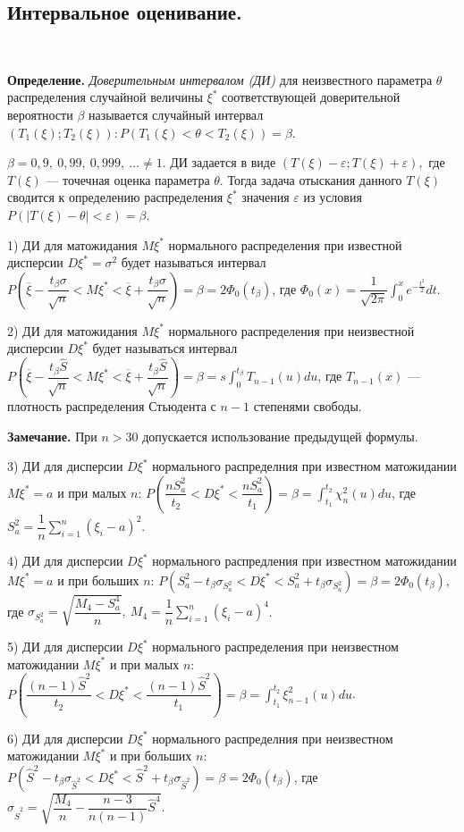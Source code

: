 \documentclass[9pt]{article}
\begin{document}
\subsection{Интервальное оценивание.}

\ 
\par\textbf{Определение.} \textit{Доверительным интервалом (ДИ)} для неизвестного параметра \(\theta\) распределения случайной величины \(\xi^*\) соответствующей доверительной вероятности \(\beta\) называется случайный интервал \((T_1(\xi);T_2(\xi)):P(T_1(\xi)<\theta<T_2(\xi))=\beta\).
\par\(\beta=0,9,\ 0,99,\ 0,999,\ ... \neq 1\).
 ДИ задается в виде \((T(\xi)-\varepsilon;T(\xi)+\varepsilon),\) где \(T(\xi)\) --- точечная оценка параметра \(\theta\). Тогда задача отыскания данного \(T(\xi)\) сводится к определению распределения \(\xi^*\) значения \(\varepsilon\) из условия \(P(|T(\xi)-\theta|<\varepsilon)=\beta\).
\par1) ДИ для матожидания \(M\xi^*\) нормального распределения при известной дисперсии \(D\xi^*=\sigma^2\) будет называться интервал \(P(\overline\xi-\dfrac{t_\beta\sigma}{\sqrt{n}}<M\xi^*<\overline\xi+\dfrac{t_\beta\sigma}{\sqrt{n}})=\beta=2\Phi_0(t_\beta)\), где \(\Phi_0(x)=\dfrac{1}{\sqrt{2\pi}}\int_0^xe^{-\frac{t^2}{2}}dt\).
\par2) ДИ для матожидания \(M\xi^*\) нормального распределения при неизвестной дисперсии \(D\xi^*\) будет называться интервал \(P(\overline\xi-\dfrac{t_\beta\hat{S}}{\sqrt{n}}<M\xi^*<\overline\xi+\dfrac{t_\beta\hat{S}}{\sqrt{n}})=\beta=s\int_0^{t_\beta}T_{n-1}(u)du\), где \(T_{n-1}(x)\) --- плотность распределения Стьюдента с \(n-1\) степенями свободы.
\par\textbf{Замечание.} При \(n>30\) допускается использование предыдущей формулы.
\par3) ДИ для дисперсии \(D\xi^*\) нормального распределния при известном матожидании \(M\xi^*=a\) и при малых \(n\): \(P(\dfrac{nS_a^2}{t_2}<D\xi^*<\dfrac{nS_a^2}{t_1})=\beta=\int_{t_1}^{t_2}\chi^2_n(u)du\), где \(S_a^2=\dfrac{1}{n}\displaystyle\sum_{i=1}^n(\xi_i-a)^2\).
\par4) ДИ для дисперсии \(D\xi^*\) нормального распредления при известном матожидании \(M\xi^*=a\) и при больших \(n\): \(P(S_a^2-t_\beta\sigma_{S^2_a}<D\xi^*<S_a^2+t_\beta\sigma_{S^2_a})=\beta=2\Phi_0(t_\beta)\), где \(\sigma_{S^2_a}=\sqrt{\dfrac{M_4-S^4_a}{n}},\ M_4=\dfrac{1}{n}\displaystyle\sum_{i=1}^n(\xi_i-a)^4\).
\par5) ДИ для дисперсии \(D\xi^*\) нормального распределения при неизвестном матожидании \(M\xi^*\) и при малых \(n\): \(P(\dfrac{(n-1)\hat{S}^2}{t_2}<D\xi^*<\dfrac{(n-1)\hat{S}^2}{t_1})=\beta=\int_{t_1}^{t_2}\xi^2_{n-1}(u)du\).
\par6) ДИ для дисперсии \(D\xi^*\) нормального распределния при неизвестном матожидании \(M\xi^*\) и при больших \(n\): \(P(\hat{S}^2-t_\beta\sigma_{\hat{S}^2}<D\xi^*<\hat{S}^2+t_\beta\sigma_{\hat{S}^2})=\beta=2\Phi_0(t_\beta)\), где \(\sigma_{\hat{S}^2}=\sqrt{\dfrac{M_4}{n}-\dfrac{n-3}{n(n-1)}\hat{S}^4}\).
\end{document}
